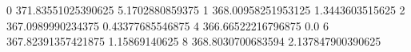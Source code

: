 0 371.83551025390625 5.1702880859375
1 368.00958251953125 1.3443603515625
2 367.0989990234375 0.43377685546875
4 366.66522216796875 0.0
6 367.82391357421875 1.15869140625
8 368.8030700683594 2.137847900390625
